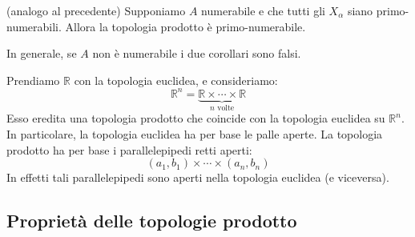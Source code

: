 \documentclass{article}
\begin{document}
\begin{cor}
	(analogo al precedente) Supponiamo $A$ numerabile e che tutti gli $X_\alpha$
	siano primo-numerabili. Allora la topologia prodotto è	primo-numerabile.
\end{cor}
\begin{oss}
	In generale, se $A$ non è numerabile i due corollari sono falsi.
\end{oss}
\begin{ex}
	Prendiamo $\mathbb{R}$ con la topologia euclidea, e consideriamo:
	$$\mathbb{R}^n=\underbrace{\mathbb{R} \times \cdots \times 	\mathbb{R}}_
	{n\text{ volte}}$$
	Esso eredita una topologia prodotto che coincide con la topologia euclidea
	su $\mathbb{R}^n$. In particolare, la topologia euclidea ha per base le
	palle aperte. La topologia prodotto ha per base i parallelepipedi retti
	aperti:
	$$(a_1,b_1)\times \cdots \times (a_n,b_n)$$
	In effetti tali parallelepipedi sono aperti nella topologia euclidea (e
	viceversa).
\end{ex}

\subsection{Proprietà delle topologie prodotto}
\end{document}
